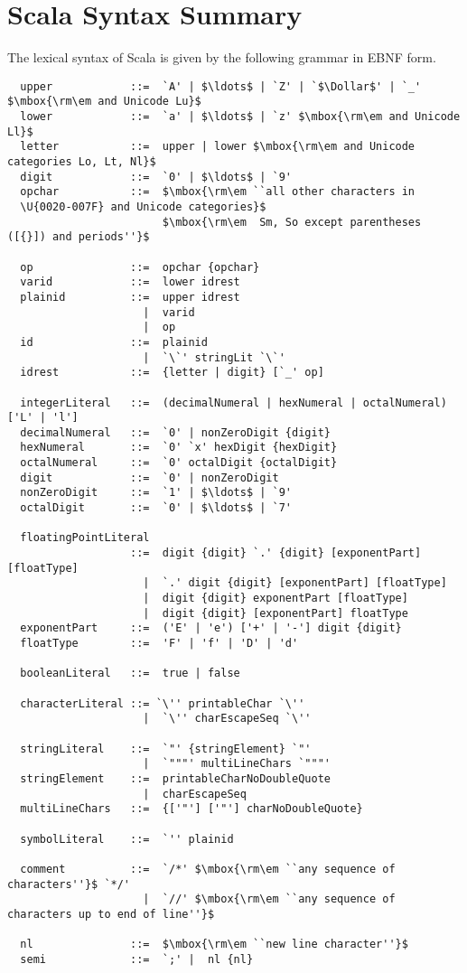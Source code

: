 
\chapter{Scala Syntax Summary}\label{sec:syntax}

The lexical syntax of Scala is given by the following grammar in EBNF
form.

{\small
\begin{lstlisting}
  upper            ::=  `A' | $\ldots$ | `Z' | `$\Dollar$' | `_' $\mbox{\rm\em and Unicode Lu}$
  lower            ::=  `a' | $\ldots$ | `z' $\mbox{\rm\em and Unicode Ll}$
  letter           ::=  upper | lower $\mbox{\rm\em and Unicode categories Lo, Lt, Nl}$
  digit            ::=  `0' | $\ldots$ | `9'
  opchar           ::=  $\mbox{\rm\em ``all other characters in
  \U{0020-007F} and Unicode categories}$
                        $\mbox{\rm\em  Sm, So except parentheses ([{}]) and periods''}$

  op               ::=  opchar {opchar} 
  varid            ::=  lower idrest
  plainid          ::=  upper idrest
                     |  varid
                     |  op
  id               ::=  plainid
                     |  `\`' stringLit `\`'
  idrest           ::=  {letter | digit} [`_' op]

  integerLiteral   ::=  (decimalNumeral | hexNumeral | octalNumeral) ['L' | 'l']
  decimalNumeral   ::=  `0' | nonZeroDigit {digit}
  hexNumeral       ::=  `0' `x' hexDigit {hexDigit}
  octalNumeral     ::=  `0' octalDigit {octalDigit}
  digit            ::=  `0' | nonZeroDigit
  nonZeroDigit     ::=  `1' | $\ldots$ | `9'
  octalDigit       ::=  `0' | $\ldots$ | `7'

  floatingPointLiteral 
                   ::=  digit {digit} `.' {digit} [exponentPart] [floatType]
                     |  `.' digit {digit} [exponentPart] [floatType]
                     |  digit {digit} exponentPart [floatType]
                     |  digit {digit} [exponentPart] floatType
  exponentPart     ::=  ('E' | 'e') ['+' | '-'] digit {digit}
  floatType        ::=  'F' | 'f' | 'D' | 'd'

  booleanLiteral   ::=  true | false

  characterLiteral ::= `\'' printableChar `\''
                     |  `\'' charEscapeSeq `\''

  stringLiteral    ::=  `"' {stringElement} `"'
                     |  `"""' multiLineChars `"""'
  stringElement    ::=  printableCharNoDoubleQuote 
                     |  charEscapeSeq
  multiLineChars   ::=  {['"'] ['"'] charNoDoubleQuote}

  symbolLiteral    ::=  `'' plainid

  comment          ::=  `/*' $\mbox{\rm\em ``any sequence of characters''}$ `*/'
                     |  `//' $\mbox{\rm\em ``any sequence of characters up to end of line''}$

  nl               ::=  $\mbox{\rm\em ``new line character''}$
  semi             ::=  `;' |  nl {nl}       
\end{lstlisting}}

